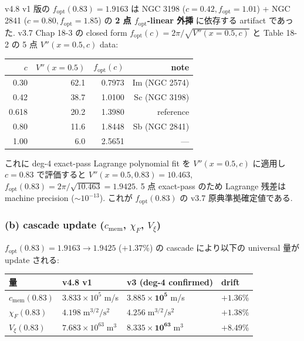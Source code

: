 \documentclass[11pt,a4paper]{ltjsarticle}
\newcommand{\cmem}{c_{\mathrm{mem}}}
\newcommand{\Vxi}{V_{\xi}}
\newcommand{\fopt}{f_{\mathrm{opt}}}
\begin{document}
v4.8 v1 版の $\fopt(0.83) = 1.9163$ は NGC 3198 ($c=0.42, \fopt=1.01$) + NGC 2841 ($c=0.80, \fopt=1.85$) の
\textbf{2 点 $\fopt$-linear 外挿} に依存する artifact であった. v3.7 Chap 18-3 の closed form
$\fopt(c) = 2\pi/\sqrt{V''(x=0.5, c)}$ と Table 18-2 の 5 点 $V''(x=0.5, c)$ data:

\begin{center}\small
\begin{tabular}{@{}rrrr@{}}
\toprule
$c$ & $V''(x=0.5)$ & $\fopt(c)$ & note \\
\midrule
0.30  & 62.1 & 0.7973 & Im (NGC 2574) \\
0.42  & 38.7 & 1.0100 & Sc (NGC 3198) \\
0.618 & 20.2 & 1.3980 & reference \\
0.80  & 11.6 & 1.8448 & Sb (NGC 2841) \\
1.00  &  6.0 & 2.5651 & --- \\
\bottomrule
\end{tabular}
\end{center}

これに deg-4 exact-pass Lagrange polynomial fit を $V''(x=0.5, c)$ に適用し $c=0.83$ で評価すると
$V''(x=0.5, 0.83) = 10.463$, $\fopt(0.83) = 2\pi/\sqrt{10.463} = 1.9425$. 5 点 exact-pass のため
Lagrange 残差は machine precision ($\sim 10^{-13}$). これが $\fopt(0.83)$ の v3.7 原典準拠確定値である.

\subsubsection*{(b) cascade update ($\cmem$, $\chi_F$, $\Vxi$)}

$\fopt(0.83) = 1.9163 \to 1.9425$ ($+1.37$\%) の cascade により以下の universal 量が update される:

\begin{center}\small
\begin{tabular}{@{}llll@{}}
\toprule
量 & v4.8 v1 & v3 (deg-4 confirmed) & drift \\
\midrule
$\cmem(0.83)$ & $3.833 \times 10^{5}$ m/s & $\mathbf{3.885 \times 10^{5}}$ m/s & $+1.36$\% \\
$\chi_F(0.83)$ & $4.198\;\mathrm{m}^{3/2}/\mathrm{s}^2$ & $\mathbf{4.256}\;\mathrm{m}^{3/2}/\mathrm{s}^2$ & $+1.38$\% \\
$\Vxi(0.83)$ & $7.683 \times 10^{63}\;\mathrm{m}^3$ & $\mathbf{8.335 \times 10^{63}}\;\mathrm{m}^3$ & $+8.49$\% \\
\bottomrule
\end{tabular}
\end{center}
\end{document}
